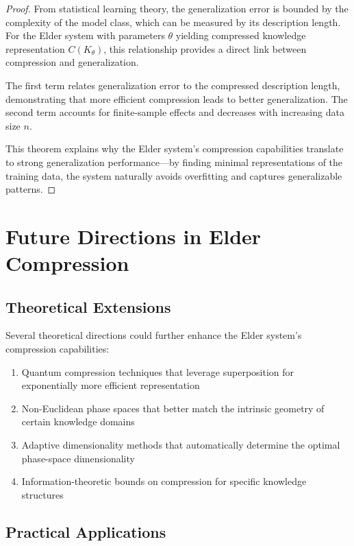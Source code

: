 \begin{proof}
From statistical learning theory, the generalization error is bounded by the complexity of the model class, which can be measured by its description length. For the Elder system with parameters $\theta$ yielding compressed knowledge representation $C(K_{\theta})$, this relationship provides a direct link between compression and generalization.

The first term relates generalization error to the compressed description length, demonstrating that more efficient compression leads to better generalization. The second term accounts for finite-sample effects and decreases with increasing data size $n$.

This theorem explains why the Elder system's compression capabilities translate to strong generalization performance—by finding minimal representations of the training data, the system naturally avoids overfitting and captures generalizable patterns.
\end{proof}

\section{Future Directions in Elder Compression}

\subsection{Theoretical Extensions}

Several theoretical directions could further enhance the Elder system's compression capabilities:

\begin{enumerate}
    \item Quantum compression techniques that leverage superposition for exponentially more efficient representation
    \item Non-Euclidean phase spaces that better match the intrinsic geometry of certain knowledge domains
    \item Adaptive dimensionality methods that automatically determine the optimal phase-space dimensionality
    \item Information-theoretic bounds on compression for specific knowledge structures
\end{enumerate}

\subsection{Practical Applications}

